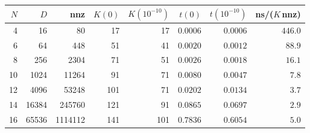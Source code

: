\begin{tabular}{rrrrrrrr}
\toprule
$N$ & $D$ & nnz & $K(0)$ & $K(10^{-10})$ & $t(0)$ & $t(10^{-10})$ & ns/($K$\,nnz) \\
\midrule
4 & 16 & 80 & 17 & 17 & $0.0006$ & $0.0006$ & $446.0$ \\
6 & 64 & 448 & 51 & 41 & $0.0020$ & $0.0012$ & $88.9$ \\
8 & 256 & 2304 & 71 & 51 & $0.0026$ & $0.0018$ & $16.1$ \\
10 & 1024 & 11264 & 91 & 71 & $0.0080$ & $0.0047$ & $7.8$ \\
12 & 4096 & 53248 & 101 & 71 & $0.0202$ & $0.0134$ & $3.7$ \\
14 & 16384 & 245760 & 121 & 91 & $0.0865$ & $0.0697$ & $2.9$ \\
16 & 65536 & 1114112 & 141 & 101 & $0.7836$ & $0.6054$ & $5.0$ \\
\bottomrule
\end{tabular}
